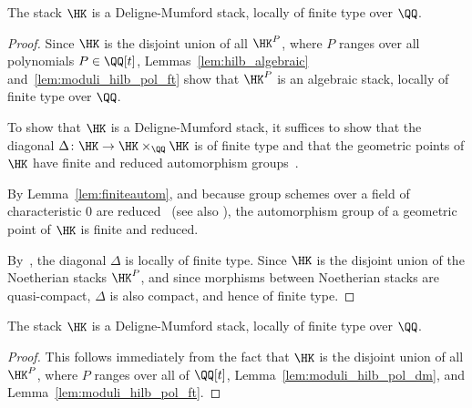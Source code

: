 \begin{lemma}\label{lem:moduli_hilb_pol_dm}
The stack $\HK$ is a Deligne-Mumford stack, locally of finite type over $\QQ$.
\end{lemma}
\begin{proof}
Since $\HK$ is the disjoint union of all $\HK^P$, where $P$ ranges over all polynomials $P \in \QQ[t]$, Lemmas~\ref{lem:hilb_algebraic} and~\ref{lem:moduli_hilb_pol_ft} show that $\HK^P$ is an algebraic stack, locally of finite type over $\QQ$.

To show that $\HK$ is a Deligne-Mumford stack, it suffices to show that the diagonal $\Delta\colon \HK \rightarrow \HK \times_{\QQ} \HK$ is of finite type and that the geometric points of $\HK$ have finite and reduced automorphism groups~\cite[Remark~8.3.4]{OlssonStacks}.

By Lemma~\ref{lem:finiteautom}, and because group schemes over a field of characteristic $0$ are reduced~\cite[Corollaire~$\text{VI}_{\B}$.1.6.1]{SGA3} (see also \cite[Corollaire~4.2.8]{Perrin}), the automorphism group of a geometric point of $\HK$ is finite and reduced.

By~\cite[Tag~04XS]{SP}, the diagonal $\Delta$ is locally of finite type. Since $\HK$ is the disjoint union of the Noetherian stacks $\HK^P$, and since morphisms between Noetherian stacks are quasi-compact, $\Delta$ is also compact, and hence of finite type.
\end{proof}


\begin{lemma}\label{lem:moduli_loc_ft}
The stack $\HK$ is a Deligne-Mumford stack, locally of finite type over $\QQ$.
\end{lemma}
\begin{proof}
    This follows immediately from the fact that $\HK$ is the disjoint union of all $\HK^P$, where $P$ ranges over all of $\QQ[t]$, Lemma~\ref{lem:moduli_hilb_pol_dm}, and Lemma~\ref{lem:moduli_hilb_pol_ft}.
\end{proof}

